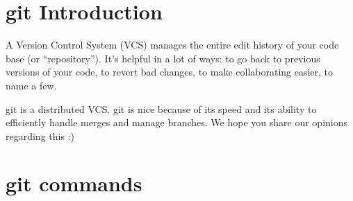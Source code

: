 \documentclass[12pt]{article}
\begin{document}
\section{git Introduction}
A Version Control System (VCS) manages the entire edit history of your code base (or ``repository''). It's helpful in a lot of ways: to go back to previous versions of your code, to revert bad changes, to make collaborating easier, to name a few.

git is a distributed VCS. git is nice because of its speed and its ability to efficiently handle merges and manage branches. We hope you share our opinions regarding this :)

\section{git commands}
\end{document}
